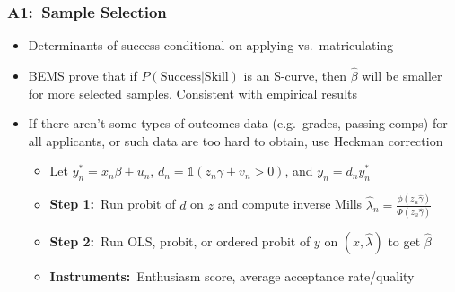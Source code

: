 \documentclass[12pt, aspectratio=169]{beamer}
\begin{document}
\begin{frame}[label=sas]
\frametitle{A1:\ Sample Selection}
\begin{itemize}
\item Determinants of success conditional on applying vs.\ matriculating
\vspace{10pt}
\item BEMS  prove that if $P(\text{Success}|\text{Skill})$ is an S-curve, then $\hat\beta$ will be smaller for more selected samples. Consistent with empirical results
\vspace{10pt}
\item If there aren't some types of outcomes data (e.g.\ grades, passing comps) for all applicants, or such data are too hard to obtain, use Heckman correction
\vspace{5pt}
\begin{itemize}
\item Let $y_n^*=x_n\beta+u_n$, $d_n=\mathds{1}(z_n\gamma+v_n>0)$, and $y_n=d_ny_n^*$
\vspace{5pt}
\item \textbf{Step 1:}\ Run probit of $d$ on $z$ and compute inverse Mills $\hat\lambda_n=\frac{\phi(z_n\hat\gamma)}{\Phi(z_n\hat\gamma)}$
\vspace{5pt}
\item \textbf{Step 2:}\ Run OLS, probit, or ordered probit of $y$ on $(x,\hat\lambda)$ to get $\hat\beta$
\vspace{5pt}
\item \textbf{Instruments:}\ Enthusiasm score, average acceptance rate/quality
\vspace{10pt}
\end{itemize}
\end{itemize}
\hyperlink{dd}{}
\end{frame}
\end{document}
